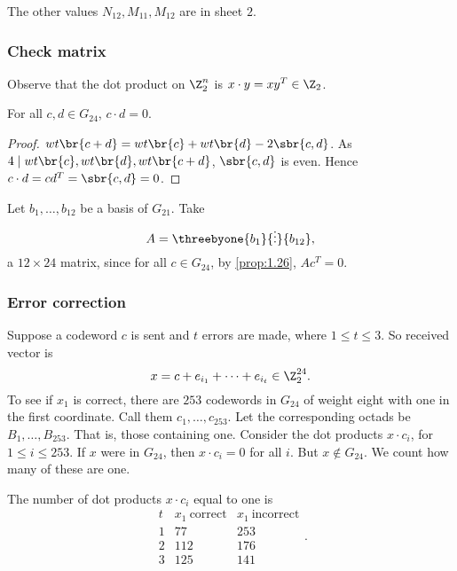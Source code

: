 The other values $ N_{12}, M_{11}, M_{12} $ are in sheet $ 2 $.

\pagebreak

\subsubsection{Check matrix}

Observe that the dot product on $ \Z_2^n $ is $ x \cdot y = xy^T \in \Z_2 $.

\begin{proposition}
\label{prop:1.26}
For all $ c, d \in G_{24} $, $ c \cdot d = 0 $.
\end{proposition}

\begin{proof}
$ wt\br{c + d} = wt\br{c} + wt\br{d} - 2\sbr{c, d} $. As $ 4 \mid wt\br{c}, wt\br{d}, wt\br{c + d} $, $ \sbr{c, d} $ is even. Hence $ c \cdot d = cd^T = \sbr{c, d} = 0 $.
\end{proof}

Let $ b_1, \dots, b_{12} $ be a basis of $ G_{21} $. Take
$$ A = \threebyone{b_1}{\vdots}{b_{12}}, $$
a $ 12 \times 24 $ matrix, since for all $ c \in G_{24} $, by \ref{prop:1.26}, $ Ac^T = 0 $.

\subsubsection{Error correction}

Suppose a codeword $ c $ is sent and $ t $ errors are made, where $ 1 \le t \le 3 $. So received vector is
$$ x = c + e_{i_1} + \dots + e_{i_t} \in \Z_2^{24}. $$
To see if $ x_1 $ is correct, there are $ 253 $ codewords in $ G_{24} $ of weight eight with one in the first coordinate. Call them $ c_1, \dots, c_{253} $. Let the corresponding octads be $ B_1, \dots, B_{253} $. That is, those containing one. Consider the dot products $ x \cdot c_i $, for $ 1 \le i \le 253 $. If $ x $ were in $ G_{24} $, then $ x \cdot c_i = 0 $ for all $ i $. But $ x \notin G_{24} $. We count how many of these are one.

\begin{proposition}
The number of dot products $ x \cdot c_i $ equal to one is
$$
\begin{array}{c|cc}
t & x_1 \ \text{correct} & x_1 \ \text{incorrect} \\
\hline
1 & 77 & 253 \\
2 & 112 & 176 \\
3 & 125 & 141
\end{array}.
$$
\end{proposition}

